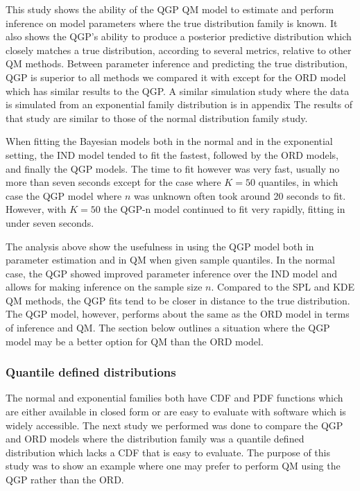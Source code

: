 \documentclass[preprint,12pt,authoryear]{elsarticle}
\begin{document}
This study shows the ability of the QGP QM model to estimate and perform inference on model parameters where the true distribution family is known. It also shows the QGP's ability to produce a posterior predictive distribution which closely matches a true distribution, according to several metrics, relative to other QM methods. Between parameter inference and predicting the true distribution, QGP is superior to all methods we compared it with except for the ORD model which has similar results to the QGP. A similar simulation study where the data is simulated from an exponential family distribution is in appendix 
The results of that study are similar to those of the normal distribution family study.




When fitting the Bayesian models both in the normal and in the exponential setting, the IND model tended to fit the fastest, followed by the ORD models, and finally the QGP models. The time to fit however was very fast, usually no more than seven seconds except for the case where $K = 50$ quantiles, in which case the QGP model where $n$ was unknown often took around 20 seconds to fit. However, with $K= 50$ the QGP-n model continued to fit very rapidly, fitting in under seven seconds.

The analysis above show the usefulness in using the QGP model both in parameter estimation and in QM when given sample quantiles. In the normal case, the QGP showed improved parameter inference over the IND model and allows for making inference on the sample size $n$. Compared to the SPL and KDE QM methods, the QGP fits tend to be closer in distance to the true distribution. The QGP model, however, performs about the same as the ORD model in terms of inference and QM. The section below outlines a situation where the QGP model may be a better option for QM than the ORD model. 


\subsubsection{Quantile defined distributions}
The normal and exponential families both have CDF and PDF functions which are either available in closed form or are easy to evaluate with software which is widely accessible. The next study we performed was done to compare the QGP and ORD models where the distribution family was a quantile defined distribution which lacks a CDF that is easy to evaluate. The purpose of this study was to show an example where one may prefer to perform QM using the QGP rather than the ORD.
\end{document}
